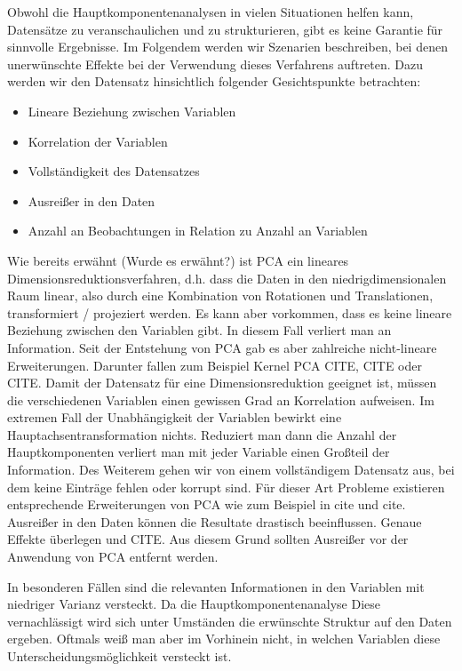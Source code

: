 Obwohl die Hauptkomponentenanalysen in vielen Situationen helfen kann, Datensätze zu veranschaulichen und zu strukturieren, gibt es keine Garantie für sinnvolle Ergebnisse. Im Folgendem werden wir Szenarien beschreiben, bei denen unerwünschte Effekte bei der Verwendung dieses Verfahrens auftreten. Dazu werden wir den Datensatz hinsichtlich folgender Gesichtspunkte betrachten: 

\begin{itemize}
\item Lineare Beziehung zwischen Variablen
\item Korrelation der Variablen
\item Vollständigkeit des Datensatzes
\item Ausreißer in den Daten
\item Anzahl an Beobachtungen in Relation zu Anzahl an Variablen
\end{itemize}

Wie bereits erwähnt (Wurde es erwähnt?) ist PCA ein lineares Dimensionsreduktionsverfahren, d.h. dass die Daten in den niedrigdimensionalen Raum linear, also durch eine Kombination von Rotationen und Translationen, transformiert / projeziert  werden. Es kann aber vorkommen, dass es keine lineare Beziehung zwischen den Variablen gibt. In diesem Fall verliert man an Information. Seit der Entstehung von PCA gab es aber zahlreiche nicht-lineare Erweiterungen. Darunter fallen zum Beispiel Kernel PCA CITE, CITE oder CITE.
Damit der Datensatz für eine Dimensionsreduktion geeignet ist, müssen die verschiedenen Variablen einen gewissen Grad an Korrelation aufweisen. Im extremen Fall der Unabhängigkeit der Variablen bewirkt eine Hauptachsentransformation nichts. Reduziert man dann die Anzahl der Hauptkomponenten verliert man mit jeder Variable einen Großteil der Information.  
Des Weiterem gehen wir von einem vollständigem Datensatz aus, bei dem keine Einträge fehlen oder korrupt sind. Für dieser Art Probleme existieren entsprechende Erweiterungen von PCA wie zum Beispiel in cite und cite. Ausreißer in den Daten können die Resultate drastisch beeinflussen. Genaue Effekte überlegen und CITE. Aus diesem Grund sollten Ausreißer vor der Anwendung von PCA entfernt werden.

In besonderen Fällen sind die relevanten Informationen in den Variablen mit niedriger Varianz versteckt. Da die Hauptkomponentenanalyse Diese vernachlässigt wird sich unter Umständen die erwünschte Struktur auf den Daten ergeben. Oftmals weiß man aber im Vorhinein nicht, in welchen Variablen diese Unterscheidungsmöglichkeit versteckt ist.


